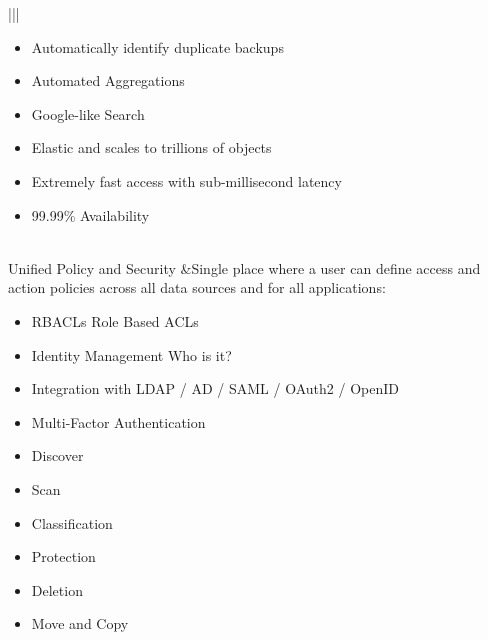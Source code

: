 \documentclass[letterpaper,10pt,english]{sphinxhowto}
\begin{document}
\begin{savenotes}
\begin{longtable}{|||}
\begin{itemize}
\begin{itemize}
\end{itemize}

\item {} 
Automatically identify duplicate backups

\item {} 
Automated Aggregations

\item {} 
Google-like Search

\item {} 
Elastic and scales to trillions of objects

\item {} 
Extremely fast access with sub-millisecond latency

\item {} 
99.99\% Availability

\end{itemize}
\\
\hline
Unified Policy and
Security
&Single place where a user can define access and action policies across all data sources
and for all applications:

\begin{itemize}
\item {} 
RBACLs \textendash{} Role Based ACLs

\item {} 
Identity Management \textendash{} Who is it?

\item {} 
Integration with LDAP / AD / SAML / OAuth2 / OpenID

\item {} 
Multi-Factor Authentication

\end{itemize}

\begin{itemize}
\item {} 
Discover

\item {} 
Scan

\item {} 
Classification

\item {} 
Protection

\item {} 
Deletion

\item {} 
Move and Copy

\end{itemize}


\end{longtable}
\end{savenotes}
\end{document}
